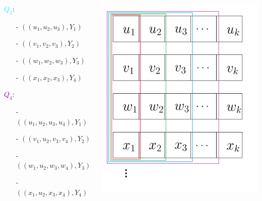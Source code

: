\begin{frame}
\begin{columns}
	\begin{block}{}
	\textcolor{cyan}{$Q_3$}:
		\begin{itemize}
			\item[-] $((u_1, u_2, u_3), Y_1)$
			\item[-] $((v_1, v_2, v_3), Y_2)$
			\item[-] $((w_1, w_2, w_3), Y_3)$
			\item[-] $((x_1, x_2, x_3), Y_4)$
		\end{itemize}
	\textcolor{purple}{$Q_4$}:
		\begin{itemize}
			\item[-] $((u_1, u_2, u_3, u_4), Y_1)$
			\item[-] $((v_1, u_2, v_3, v_4), Y_2)$
			\item[-] $((w_1, u_2, w_3, w_4), Y_3)$
			\item[-] $((x_1, u_2, x_3, x_4), Y_4)$
		\end{itemize}	
	\end{block}
	\includegraphics[width=1\textwidth]{images/Graph_Q-l_Farbe.png}

\end{columns}
\end{frame}


